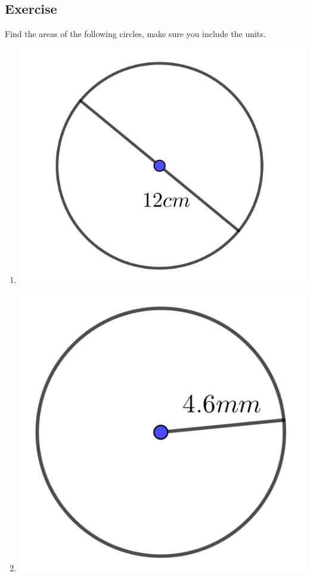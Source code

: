 \subsection{Exercise}
Find the areas of the following circles, make sure you include the units.
\begin{multicols}{2}
\begin{enumerate}
	\item \includegraphics{./Images/Measurement/CircleAreaEx1.png}
	\item \includegraphics{./Images/Measurement/CircleAreaEx2.png}

\end{enumerate}
\end{multicols}
